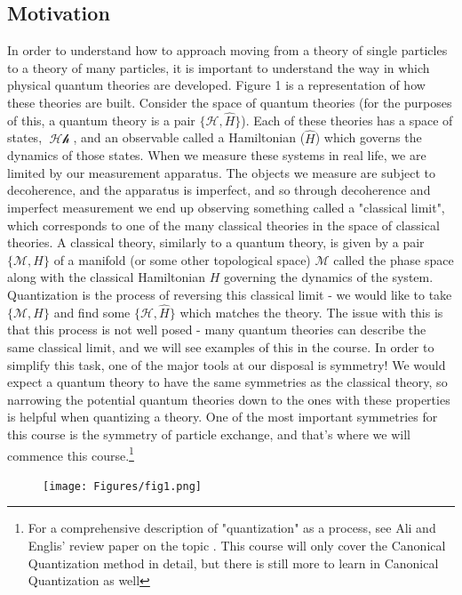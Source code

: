 \documentclass{article}
\DeclareMathOperator{\Hh}{\mathcal{Hh}}
\begin{document}
\subsection{Motivation}
In order to understand how to approach moving from a theory of single particles to a theory of many particles, it is important to understand the way in which physical quantum theories are developed. Figure 1 is a representation of how these theories are built. Consider the space of quantum theories (for the purposes of this, a quantum theory is a pair $\{\mathcal{H},\hat H\}$). Each of these theories has a space of states, $\Hh$, and an observable called a Hamiltonian ($\hat H$) which governs the dynamics of those states. When we measure these systems in real life, we are limited by our measurement apparatus. The objects we measure are subject to decoherence, and the apparatus is imperfect, and so through decoherence and imperfect measurement we end up observing something called a "classical limit", which corresponds to one of the many classical theories in the space of classical theories. A classical theory, similarly to a quantum theory, is given by a pair $\{\mathcal{M},H\}$ of a manifold (or some other topological space) $\mathcal{M}$ called the phase space along with the classical Hamiltonian $H$ governing the dynamics of the system. Quantization is the process of reversing this classical limit - we would like to take $\{\mathcal{M},H\}$ and find some $\{\mathcal{H},\hat H\}$ which matches the theory. The issue with this is that this process is not well posed - many quantum theories can describe the same classical limit, and we will see examples of this in the course. In order to simplify this task, one of the major tools at our disposal is symmetry! We would expect a quantum theory to have the same symmetries as the classical theory, so narrowing the potential quantum theories down to the ones with these properties is helpful when quantizing a theory. One of the most important symmetries for this course is the symmetry of particle exchange, and that's where we will commence this course.\footnote{For a comprehensive description of "quantization" as a process, see Ali and Englis' review paper on the topic \cite{ali2005quantization}. This course will only cover the Canonical Quantization method in detail, but there is still more to learn in Canonical Quantization as well}
\begin{figure}[ht]
    \centering
    \texttt{[image: Figures/fig1.png]}
    \caption*{}
    \label{fig:fig11}
\end{figure}
\pagebreak
\end{document}
